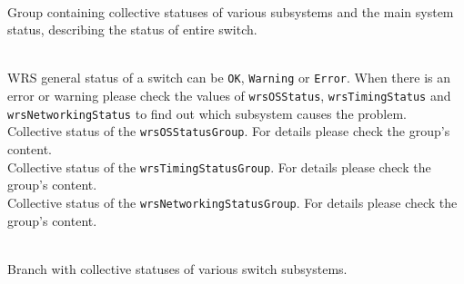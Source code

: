 

 {\\
  Group containing collective statuses
  of various subsystems and the main system status, describing the status of
  entire switch.}

   {\\
    WRS general status of a switch can be \texttt{OK}, \texttt{Warning} or
    \texttt{Error}. When there is an error or warning please check the values of
    \texttt{wrsOSStatus}, \texttt{wrsTimingStatus} and
    \texttt{wrsNetworkingStatus} to find out which subsystem causes the problem.}
   {\\
    Collective status of the \texttt{wrsOSStatusGroup}. For details please check
    the group's content.}
   {\\
    Collective status of the \texttt{wrsTimingStatusGroup}. For details please
    check the group's content.}
   {\\
    Collective status of the \texttt{wrsNetworkingStatusGroup}. For details
    please check the group's content.}

 {\\
  Branch with collective statuses of various switch subsystems.}

